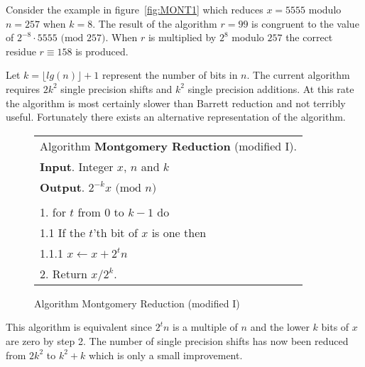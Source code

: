 \documentclass[b5paper]{book}
\begin{document}
Consider the example in figure~\ref{fig:MONT1} which reduces $x = 5555$ modulo $n = 257$ when $k = 8$.  The result of the algorithm $r = 99$ is
congruent to the value of $2^{-8} \cdot 5555 \mbox{ (mod }257\mbox{)}$.  When $r$ is multiplied by $2^8$ modulo $257$ the correct residue 
$r \equiv 158$ is produced.  

Let $k = \lfloor lg(n) \rfloor + 1$ represent the number of bits in $n$.  The current algorithm requires $2k^2$ single precision shifts
and $k^2$ single precision additions.  At this rate the algorithm is most certainly slower than Barrett reduction and not terribly useful.  
Fortunately there exists an alternative representation of the algorithm.

\begin{figure}[!here]
\begin{small}
\begin{center}
\begin{tabular}{l}
\hline Algorithm \textbf{Montgomery Reduction} (modified I). \\
\textbf{Input}.   Integer $x$, $n$ and $k$ \\
\textbf{Output}.  $2^{-k}x \mbox{ (mod }n\mbox{)}$ \\
\hline \\
1.  for $t$ from $0$ to $k - 1$ do \\
\hspace{3mm}1.1  If the $t$'th bit of $x$ is one then \\
\hspace{6mm}1.1.1  $x \leftarrow x + 2^tn$ \\
2.  Return $x/2^k$. \\
\hline
\end{tabular}
\end{center}
\end{small}
\caption{Algorithm Montgomery Reduction (modified I)}
\end{figure}

This algorithm is equivalent since $2^tn$ is a multiple of $n$ and the lower $k$ bits of $x$ are zero by step 2.  The number of single
precision shifts has now been reduced from $2k^2$ to $k^2 + k$ which is only a small improvement.
\end{document}
